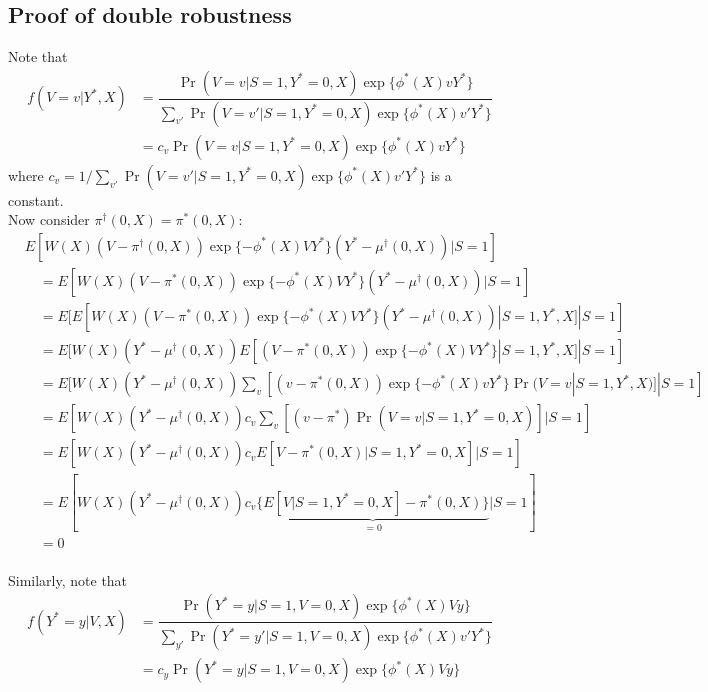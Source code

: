 \begin{appendix}
\begin{refsection}
    \subsection{Proof of double robustness}
     Note that 
    \begin{align*}
        f(V = v | Y^*, X) &= \dfrac{\Pr(V = v | S = 1, Y^* = 0, X)\exp\{\phi^*(X)vY^*\}}{\sum_{v'}\Pr(V = v' | S = 1, Y^* = 0, X)\exp\{\phi^*(X)v'Y^*\}} \\
        &= c_v\Pr(V = v | S = 1, Y^* = 0, X)\exp\{\phi^*(X)vY^*\}
    \end{align*}
    where $c_v = 1 / \sum_{v'}\Pr(V = v' | S = 1, Y^* = 0, X)\exp\{\phi^*(X)v'Y^*\}$ is a constant. 
    \vspace{1em} \\
    \noindent Now consider $ \pi^\dagger(0,X) = \pi^*(0,X)$:
    \begin{align*}
        &E[W(X)(V-\pi^\dagger(0,X))\exp\{-\phi^*(X)VY^*\}(Y^* - \mu^\dagger(0,X)) | S = 1]  \\
        &\quad = E[W(X)(V-\pi^*(0,X))\exp\{-\phi^*(X)VY^*\}(Y^* - \mu^\dagger(0,X)) | S = 1] \\
        &\quad = E[E[W(X)(V-\pi^*(0,X))\exp\{-\phi^*(X)VY^*\}(Y^* - \mu^\dagger(0,X)) | S=1, Y^*, X] | S = 1]\\
        &\quad = E[W(X)(Y^* - \mu^\dagger(0,X))E[(V-\pi^*(0,X))\exp\{-\phi^*(X)VY^*\} | S=1, Y^*, X] | S = 1] \\
        &\quad = E[W(X)(Y^* - \mu^\dagger(0,X))\sum_v[(v-\pi^*(0,X))\exp\{-\phi^*(X)vY^*\} \Pr(V = v | S=1, Y^*, X)] | S = 1] \\
        &\quad = E[W(X)(Y^* - \mu^\dagger(0,X))c_v\sum_v\left[(v-\pi^*)\Pr(V = v | S = 1, Y^* = 0, X)\right] | S = 1] \\
        &\quad = E[W(X)(Y^* - \mu^\dagger(0,X))c_vE\left[V-\pi^*(0,X)| S = 1, Y^* = 0, X\right] | S = 1] \\
         &\quad = E[W(X)(Y^* - \mu^\dagger(0,X))c_v\underbrace{\{E\left[V| S = 1, Y^* = 0, X\right] -\pi^*(0,X)\}}_{=0}| S = 1] \\
        &\quad=0
    \end{align*}
     \vspace{1em} \\
    Similarly, note that 
    \begin{align*}
        f(Y^* = y | V, X) &= \dfrac{\Pr(Y^*=y | S = 1, V = 0, X)\exp\{\phi^*(X)Vy\}}{\sum_{y'}\Pr(Y^* = y' | S = 1, V = 0, X)\exp\{\phi^*(X)v'Y^*\}} \\
        &= c_y\Pr(Y^* = y | S = 1, V = 0, X)\exp\{\phi^*(X)Vy\}

\end{align*}
\end{refsection}
\end{appendix}
